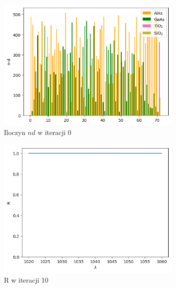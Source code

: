 \begin{figure} [H]
\begin{subfigure}[b]{0.32\textwidth}
        \includegraphics[width=\linewidth]{figures/wyniki/2stopien/morebees/result_ndresult0.png}
        \caption{Iloczyn $nd$ w iteracji 0}
    \end{subfigure}
        \begin{subfigure}[b]{0.30\textwidth}
        \includegraphics[width=\linewidth]{figures/wyniki/2stopien/morebees/result_Rresult10.png}
        \caption{R w iteracji 10}
    \end{subfigure}
        \begin{subfigure}[b]{0.31\textwidth}

\end{subfigure}
\end{figure}
